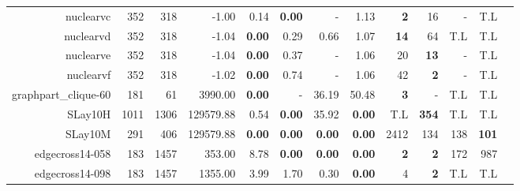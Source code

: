 \begin{landscape}
\begin{table*}[t]
\begin{tabular}{|r|r|r||r||r|r|r|r||r|r|r|r|r|}
                           nuclearvc &           352 &           318 &                             -1.00 &           0.14 &  \textbf{0.00} &              - &           1.13 &         \textbf{2} &                 16 &                  - &                T.L \\ 
                           nuclearvd &           352 &           318 &                             -1.04 &  \textbf{0.00} &           0.29 &           0.66 &           1.07 &        \textbf{14} &                 64 &                T.L &                T.L \\ 
                           nuclearve &           352 &           318 &                             -1.04 &  \textbf{0.00} &           0.37 &              - &           1.06 &                 20 &        \textbf{13} &                  - &                T.L \\ 
                           nuclearvf &           352 &           318 &                             -1.02 &  \textbf{0.00} &           0.74 &              - &           1.06 &                 42 &         \textbf{2} &                  - &                T.L \\ 
                graphpart\_clique-60 &           181 &            61 &                           3990.00 &  \textbf{0.00} &              - &          36.19 &          50.48 &         \textbf{3} &                  - &                T.L &                T.L \\ 
                             SLay10H &          1011 &          1306 &                         129579.88 &           0.54 &  \textbf{0.00} &          35.92 &  \textbf{0.00} &                T.L &       \textbf{354} &                T.L &                T.L \\ 
                             SLay10M &           291 &           406 &                         129579.88 &  \textbf{0.00} &  \textbf{0.00} &  \textbf{0.00} &  \textbf{0.00} &               2412 &                134 &                138 &       \textbf{101} \\ 
                     edgecross14-058 &           183 &          1457 &                            353.00 &           8.78 &  \textbf{0.00} &  \textbf{0.00} &  \textbf{0.00} &         \textbf{2} &         \textbf{2} &                172 &                987 \\ 
                     edgecross14-098 &           183 &          1457 &                           1355.00 &           3.99 &           1.70 &           0.30 &  \textbf{0.00} &                  4 &         \textbf{2} &                T.L &                T.L \\ 

\end{tabular}
\end{table*}
\end{landscape}
